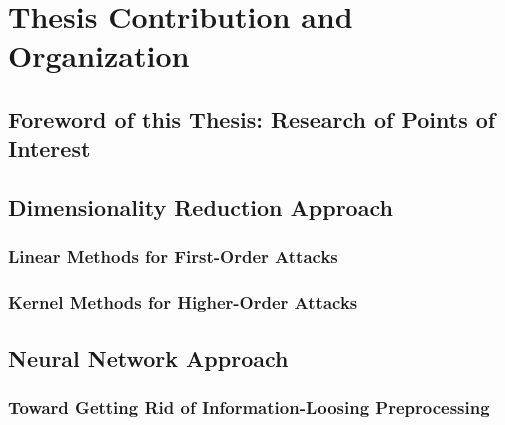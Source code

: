 \section{Thesis Contribution and Organization}
\subsection{Foreword of this Thesis: Research of Points of Interest}
\subsection{Dimensionality Reduction Approach}
\subsubsection{Linear Methods for First-Order Attacks}
\subsubsection{Kernel Methods for Higher-Order Attacks}
\subsection{Neural Network Approach}
\subsubsection{Toward Getting Rid of Information-Loosing Preprocessing}